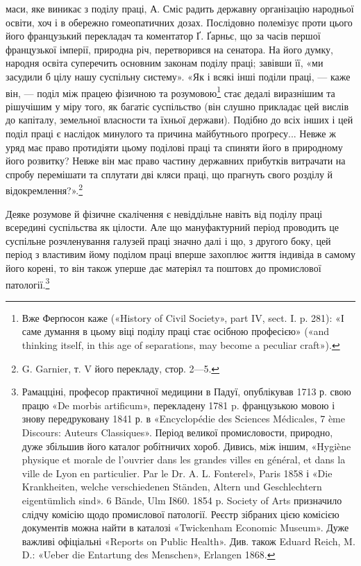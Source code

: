 маси, яке виникає з поділу праці, А. Сміс радить державну
організацію народньої освіти, хоч і в обережно гомеопатичних
дозах. Послідовно полемізує проти цього його французький
перекладач та коментатор Ґ. Ґарньє, що за часів першої французької
імперії, природна річ, перетворився на сенатора. На його
думку, народня освіта суперечить основним законам поділу праці;
завівши її, «ми засудили б цілу нашу суспільну систему». «Як
і всякі інші поділи праці, — каже він, — поділ між працею фізичною
та розумовою\footnote{
Вже Ферґюсон каже («History of Civil Society», part IV, sect. I.
p. 281): «І саме думання в цьому віці поділу праці стає осібною професією»
(«and thinking itself, in this age of separations, may become a peculiar
craft»).
} стає дедалі виразнішим та рішучішим у
міру того, як багатіє суспільство (він слушно прикладає цей
вислів до капіталу, земельної власности та їхньої держави).
Подібно до всіх інших і цей поділ праці є наслідок минулого та
причина майбутнього проґресу... Невже ж уряд має право протидіяти
цьому поділові праці та спиняти його в природному його
розвитку? Невже він має право частину державних прибутків
витрачати на спробу перемішати та сплутати дві кляси праці,
що прагнуть свого розділу й відокремлення?».\footnote{
G. Garnier, т. V його перекладу, стор. 2—5.
}

Деяке розумове й фізичне скалічення є невіддільне навіть від
поділу праці всередині суспільства як цілости. Але що мануфактурний
період проводить це суспільне розчленування галузей
праці значно далі і що, з другого боку, цей період з властивим
йому поділом праці вперше захоплює життя індивіда в самому
його корені, то він також уперше дає матеріял та поштовх до
промислової патології.\footnote{
Рамацціні, професор практичної медицини в Падуї, опублікував
1713 р. свою працю «De morbis artificum», перекладену 1781 p.
французькою мовою і знову передруковану 1841 р. в «Encyclopédie des
Sciences Médicales, 7 ème Discours: Auteurs Classiques». Період великої
промисловости, природно, дуже збільшив його каталог робітничих хороб.
Дивись, між іншим, «Hygiène physique et morale de l’ouvrier dans les
grandes villes en général, et dans la ville de Lyon en particulier. Par le
Dr. A. L. Fonterel», Paris 1858 і «Die Krankheiten, welche verschiedenen
Ständen, Altern und Geschlechtern eigentümlich sind». 6 Bände, Ulm I860.
1854 p. Society of Arts призначило слідчу комісію щодо промислової
патології. Реєстр зібраних цією комісією документів можна найти в каталозі
«Twickenham Economic Museum». Дуже важливі офіціальні «Reports
on Public Health». Див. також Eduard Reich, M. D.: «Ueber
die Entartung des Menschen», Erlangen 1868.
}

